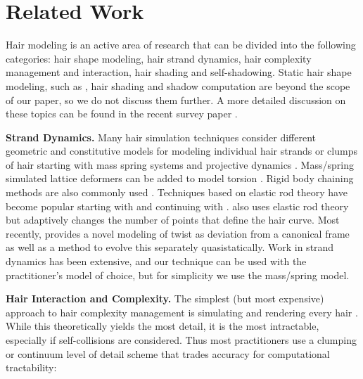 \section{Related Work}

Hair modeling is an active area of research that can be divided into
the following categories: hair shape modeling, hair strand dynamics,
hair complexity management and interaction, hair shading and self-shadowing.
Static hair shape
modeling, such as
\cite{yu:2001:model-hairstyle,kim:2002:hair,choe:2005:statistical-wisp}, hair
shading and shadow
computation are beyond the scope of our paper, so we do not discuss them
further. A
more detailed discussion on these topics can be found in the recent
survey paper \cite{ward:2007:hairsurvey}.

\noindent\textbf{Strand Dynamics.} Many hair simulation techniques consider different geometric 
and constitutive models
for modeling individual hair strands or clumps of hair starting with
mass spring systems \cite{rosenblum:1991:hair} and projective dynamics
\cite{anjyo:1992:hair}.  Mass/spring simulated lattice deformers can
be added to model torsion
\cite{plante:2002:hair-complexity,selle:2008:hair}.
Rigid body chaining methods are also commonly used
\cite{brown:2004:real-time-knot,choe:2005:simulating-complex-hair,hadap:2006:orientedstrands}.
Techniques based on elastic rod theory have become popular
starting with \cite{pai:2002:strands} and continuing with
\cite{gregoire:2006:interactive-simulation-one-dimensional,bertails:2006:superhelices}.
\cite{spillmann:2007:corde} also uses elastic rod theory but
adaptively changes the number of points that define the hair curve.
Most recently, \cite{bergou:2008:elastic-rods} provides a novel
modeling of twist as deviation from a canonical frame as well as a
method to evolve this separately quasistatically. Work in strand
dynamics has been extensive, and our technique can be used with the
practitioner's model of choice, but for simplicity we use
the mass/spring model.

\noindent\textbf{Hair Interaction and Complexity.}
The simplest (but most expensive) approach to hair complexity
management is simulating and rendering every hair
\cite{rosenblum:1991:hair,anjyo:1992:hair,selle:2008:hair}. While this
theoretically yields the most detail, it is the most intractable,
especially if self-collisions are considered.  Thus most practitioners
use a clumping or continuum level of detail scheme that trades
accuracy for computational tractability:


